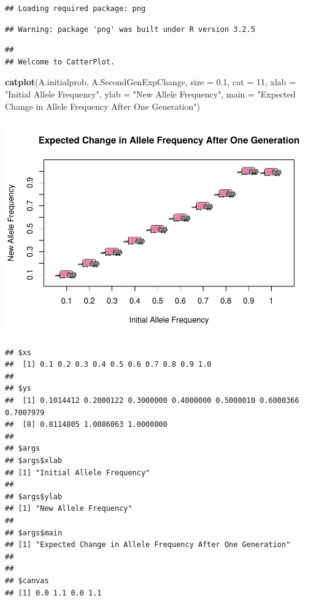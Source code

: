 \documentclass[]{article}
\newenvironment{Shaded}{\begin{snugshade}}{\end{snugshade}}
\newcommand{\KeywordTok}[1]{\textcolor[rgb]{0.13,0.29,0.53}{\textbf{{#1}}}}
\newcommand{\DataTypeTok}[1]{\textcolor[rgb]{0.13,0.29,0.53}{{#1}}}
\newcommand{\DecValTok}[1]{\textcolor[rgb]{0.00,0.00,0.81}{{#1}}}
\newcommand{\FloatTok}[1]{\textcolor[rgb]{0.00,0.00,0.81}{{#1}}}
\newcommand{\StringTok}[1]{\textcolor[rgb]{0.31,0.60,0.02}{{#1}}}
\newcommand{\NormalTok}[1]{{#1}}
\begin{document}
\begin{verbatim}
## Loading required package: png
\end{verbatim}

\begin{verbatim}
## Warning: package 'png' was built under R version 3.2.5
\end{verbatim}

\begin{verbatim}
## 
## Welcome to CatterPlot.
\end{verbatim}

\begin{Shaded}
\begin{Highlighting}[]
\KeywordTok{catplot}\NormalTok{(A.initialprob, A.SecondGenExpChange, }\DataTypeTok{size =} \FloatTok{0.1}\NormalTok{, }\DataTypeTok{cat =} \DecValTok{11}\NormalTok{, }\DataTypeTok{xlab =} \StringTok{"Initial Allele Frequency"}\NormalTok{, }\DataTypeTok{ylab =} \StringTok{"New Allele Frequency"}\NormalTok{, }\DataTypeTok{main =} \StringTok{"Expected Change in Allele Frequency After One Generation"}\NormalTok{)}
\end{Highlighting}
\end{Shaded}

\includegraphics{Problem_Set_2_files/figure-latex/unnamed-chunk-1-1.pdf}

\begin{verbatim}
## $xs
##  [1] 0.1 0.2 0.3 0.4 0.5 0.6 0.7 0.8 0.9 1.0
## 
## $ys
##  [1] 0.1014412 0.2000122 0.3000000 0.4000000 0.5000010 0.6000366 0.7007979
##  [8] 0.8114805 1.0086063 1.0000000
## 
## $args
## $args$xlab
## [1] "Initial Allele Frequency"
## 
## $args$ylab
## [1] "New Allele Frequency"
## 
## $args$main
## [1] "Expected Change in Allele Frequency After One Generation"
## 
## 
## $canvas
## [1] 0.0 1.1 0.0 1.1
\end{verbatim}
\end{document}
